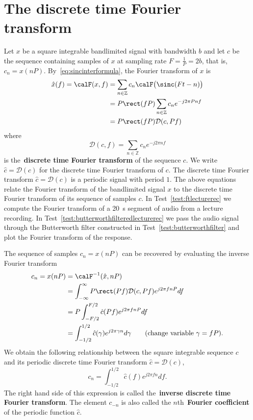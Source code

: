 \documentclass[11pt,a4paper]{book}
\theoremstyle{plain}
\numberwithin{equation}{section}
\newcommand{\ints}{{\mathbb Z}}
\newcommand{\complex}{{\mathbb C}}
\newcommand{\term}{\textbf}
\newcounter{test}
\begin{document}
\section{The discrete time Fourier transform}

\newcommand{\calD}{{\mathcal D}}

Let $x$ be a square integrable bandlimited signal with bandwidth $b$ and let $c$ be the sequence containing samples of $x$ at sampling rate $F = \tfrac{1}{P} = 2b$, that is, $c_n = x(nP)$.  By~\eqref{eq:sincinterformula}, the Fourier transform of $x$ is %
\begin{align}
\hat{x}(f) = \calF(x,f) &= \sum_{n \in \ints} c_n \calF\big(\sinc(F t - n) \big)  \nonumber \\
&= P \rect( f P ) \sum_{n \in \ints} c_n e^{-j 2\pi P n f } \nonumber \\
&= P \rect( f P ) \calD(c, Pf) \qquad \label{eq:ftanddftrelationship}
\end{align}
where
\[
\calD(c, f) = \sum_{n \in \ints} c_n e^{-j 2\pi n f}
\]
is the~\term{discrete time Fourier transform} of the sequence $c$.  We write $\hat{c} = \calD(c)$ for the discrete time Fourier transform of $c$.  The discrete time Fourier transform $\hat{c} = \calD(c)$ is a periodic signal with period $1$.  The above equations relate the Fourier transform of the bandlimited signal $x$ to the discrete time Fourier transform of its sequence of samples $c$.  In Test~\ref{test:ftlecturerec} we compute the Fourier transform of a \SI{20}{\second} segment of audio from a lecture recording.  In Test~\ref{test:butterworthfilteredlecturerec} we pass the audio signal through the Butterworth filter constructed in Test~\ref{test:butterworthfilter} and plot the Fourier transform of the response.

The sequence of samples $c_n = x(nP)$ can be recovered by evaluating the inverse Fourier transform
\begin{align*}
c_n = x(nP) &= \calF^{-1}(\hat{x}, nP) \\
&= \int_{-\infty}^\infty P \rect(Pf) \calD(c,Pf) e^{j2\pi f nP} df \\
&= P \int_{-F/2}^{F/2} \hat{c}(Pf) e^{j2\pi f nP } df \\
&= \int_{-1/2}^{1/2} \hat{c}(\gamma) e^{j 2\pi \gamma n } d\gamma \qquad \text{(change variable $\gamma = fP$)}.
\end{align*}
We obtain the following relationship between the square integrable sequence $c$ and its periodic discrete time Fourier transform $\hat{c} = \calD(c)$,
\[
c_n = \int_{-1/2}^{1/2} \hat{c}(f) e^{j 2\pi f n } df.
\]
The right hand side of this expression is called the~\term{inverse discrete time Fourier transform}.  %
The element $c_{-n}$ is also called the $n$th~\term{Fourier coefficient} of the periodic function $\hat{c}$.
\end{document}

